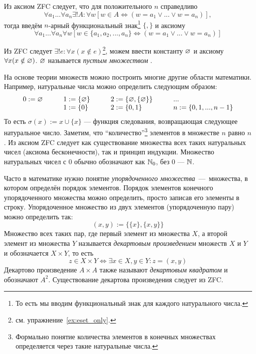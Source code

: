 Из аксиом ZFC следует, что для положительного $n$ справедливо
\[
  \forall a_1...\forall a_{n}\exists !A:\forall w
    [w\in A\iff (w=a_1\lor...\lor w=a_{n})],
\]
тогда введём $n$-арный функциональный знак\footnote{
  То есть мы вводим функциональный знак для каждого натурального числа.}
$\{,\}$ и аксиому
\[
  \forall a_1...\forall a_{n}\forall w
  [w\in \{a_1,a_2,...,a_{n}\}\iff (w=a_1\lor ...\lor w=a_{n})]
\]

Из ZFC следует ${\exists !e:\forall x(x\notin e)}$\footnote{
  см. упражнение~\ref{ex:eset_only}.},
можем ввести константу $\varnothing$ и аксиому $\forall x(x\notin \varnothing)$.
$\varnothing$ называется {\it пустым множеством}
.

На основе теории множеств можно построить многие другие области математики.
Например, натуральные числа можно определить следующим образом:
\[ \begin{array}{llll}
    0 :=\varnothing\qquad & 1  :=\{\varnothing\}\qquad & 2  :=\{\varnothing,\{\varnothing\}\}\qquad & ... \\
                    & 1:=\{0\}\qquad       & 2:=\{0,1\}
                    & n:=\{0,1,...,n-1\}
  \end{array}
\]
То есть $\sigma(x):=x\cup \{x\}$ --- функция следования,
возвращающая следующее натуральное число. Заметим, что ``количество''\footnote{
  Формально понятие количества элементов в конечных множествах определяется
  через такие натуральные числа.} элементов
в множестве $n$ равно $n$. Из аксиом ZFC следует как существование множества
всех таких натуральных чисел (аксиома бесконечности), так и принцип индукции.
Множество натуральных чисел с $0$ обычно обозначают как $\mathbb N_0$,
без $0$ --- $\mathbb N$.

Часто в математике нужно понятие {\it упорядоченного множества}~---~множества,
в котором определён порядок элементов. Порядок элементов
конечного упорядоченного множества можно
определить, просто записав его элементы в строку.
Упорядоченное множество из двух элементов (упорядоченную пару)
можно определить так:
\[
  (x,y):=\{\{x\},\{x,y\}\}
\]
Множество
всех таких пар, где первый элемент из множества $X$, а второй элемент
из множества $Y$ называется {\it декартовым произведением}
 множеств
$X$ и $Y$ и
обозначается $X\times Y$, то есть
\[
  z\in X\times Y\iff \exists x\in X,y\in Y:z=(x,y)
\]
Декартово произведение $A\times A$ также называют {\it декартовым квадратом}
и обозначают $A^{2}$. Существование декартова произведения следует из ZFC.

